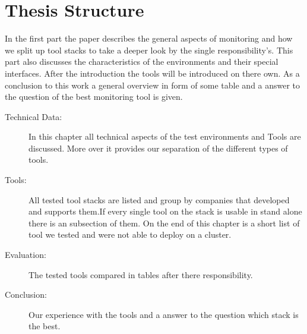 \section*{Thesis Structure}
In the first part the paper describes the general aspects of monitoring and how we split up tool stacks to take a deeper look by the single responsibility's. This part also discusses the characteristics of the environments and their special interfaces. After the introduction the tools will be introduced on there own. As a conclusion to this work a general overview in form of some table and a answer to the question of the best monitoring tool is given. 
\begin{description}
\item[Technical Data:] In this chapter all technical aspects of the test environments and Tools are discussed. More over it provides our separation of the different types of tools. 
\item[Tools:] All tested tool stacks are listed and group by companies that developed and supports them.If every single tool on the stack is usable in stand alone there is an subsection of them. On the end of this chapter is a short list of tool we tested and were not able to deploy on a cluster.
\item[Evaluation:]The tested tools compared in tables after there responsibility.
\item[Conclusion:] Our experience with the tools and a answer to the question which stack is the best.

\end{description}
